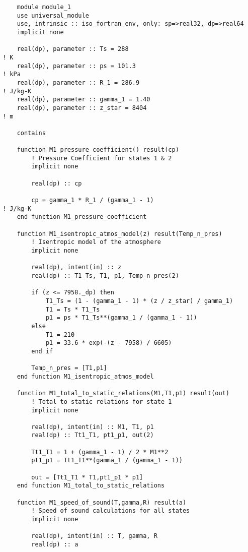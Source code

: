 \begin{verbatim}
    module module_1
    use universal_module
    use, intrinsic :: iso_fortran_env, only: sp=>real32, dp=>real64
    implicit none

    real(dp), parameter :: Ts = 288                                     ! K
    real(dp), parameter :: ps = 101.3                                   ! kPa
    real(dp), parameter :: R_1 = 286.9                                  ! J/kg-K
    real(dp), parameter :: gamma_1 = 1.40
    real(dp), parameter :: z_star = 8404                                ! m

    contains

    function M1_pressure_coefficient() result(cp)
        ! Pressure Coefficient for states 1 & 2
        implicit none

        real(dp) :: cp

        cp = gamma_1 * R_1 / (gamma_1 - 1)                              ! J/kg-K
    end function M1_pressure_coefficient

    function M1_isentropic_atmos_model(z) result(Temp_n_pres)
        ! Isentropic model of the atmosphere
        implicit none

        real(dp), intent(in) :: z
        real(dp) :: T1_Ts, T1, p1, Temp_n_pres(2)

        if (z <= 7958._dp) then
            T1_Ts = (1 - (gamma_1 - 1) * (z / z_star) / gamma_1)
            T1 = Ts * T1_Ts
            p1 = ps * T1_Ts**(gamma_1 / (gamma_1 - 1))
        else
            T1 = 210
            p1 = 33.6 * exp(-(z - 7958) / 6605)
        end if

        Temp_n_pres = [T1,p1]
    end function M1_isentropic_atmos_model

    function M1_total_to_static_relations(M1,T1,p1) result(out)
        ! Total to static relations for state 1
        implicit none

        real(dp), intent(in) :: M1, T1, p1
        real(dp) :: Tt1_T1, pt1_p1, out(2)
        
        Tt1_T1 = 1 + (gamma_1 - 1) / 2 * M1**2
        pt1_p1 = Tt1_T1**(gamma_1 / (gamma_1 - 1))

        out = [Tt1_T1 * T1,pt1_p1 * p1]
    end function M1_total_to_static_relations

    function M1_speed_of_sound(T,gamma,R) result(a)
        ! Speed of sound calculations for all states
        implicit none

        real(dp), intent(in) :: T, gamma, R
        real(dp) :: a


\end{verbatim}
